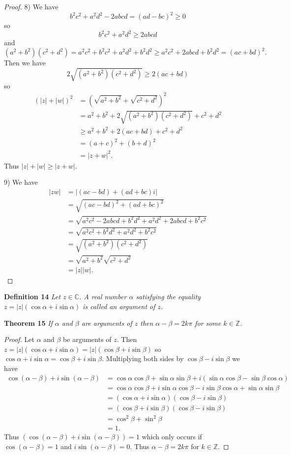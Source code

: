 \documentclass{article}
\begin{document}
\begin{flushleft}
\begin{proof}
8) We have
\[
b^2c^2 + a^2d^2 -2abcd = (ad-bc)^2 \geq 0
\]
so
\[
b^2c^2 + a^2d^2 \geq 2abcd
\]
and
\[
(a^2 + b^2)(c^2 + d^2) = a^2c^2 +b^2c^2 + a^2d^2 + b^2d^2 \geq a^2c^2 + 2abcd + b^2d^2 = (ac+bd)^2.
\]
Then we have
\[
2 \sqrt{(a^2 + b^2)(c^2 + d^2)} \geq 2(ac+bd)
\]
so
\begin{align*}
(|z| + |w|)^2 &= (\sqrt{a^2 + b^2} + \sqrt{c^2 + d^2})^2 \\
		   &= a^2 + b^2 + 2 \sqrt{(a^2 + b^2)(c^2 + d^2)} + c^2 + d^2 \\
		   & \geq a^2 + b^2 + 2(ac+bd) + c^2 + d^2 \\
		   &= (a+c)^2 + (b+d)^2 \\
		   &= |z+w|^2.
\end{align*}
Thus $|z| + |w| \geq |z+w|$.\newline

9) We have
\begin{align*}
|zw| &= |(ac-bd) + (ad+bc)i| \\
	&= \sqrt{(ac-bd)^2 + (ad+bc)^2} \\
	&= \sqrt{a^2c^2 -2abcd + b^2d^2 + a^2d^2 + 2abcd + b^2c^2} \\
	&= \sqrt{a^2c^2 + b^2d^2 + a^2d^2 + b^2c^2} \\
	&= \sqrt{(a^2 + b^2)(c^2 + d^2)} \\
	&= \sqrt{a^2 + b^2} \sqrt{c^2 + d^2} \\
	&= |z||w|.
\end{align*}
\end{proof}

\textbf{Definition 14}
\textsl{Let $z \in \mathbb{C}$. A real number $\alpha$ satisfying the equality $z = |z| (\cos \alpha + i \sin \alpha)$ is called an argument of $z$.}\newline

\textbf{Theorem 15}
\textsl{If $\alpha$ and $\beta$ are arguments of $z$ then $\alpha - \beta = 2k \pi$ for some $k \in \mathbb{Z}$.}
\begin{proof}
Let $\alpha$ and $\beta$ be arguments of $z$. Then $z = |z| (\cos \alpha + i \sin \alpha) = |z| (\cos \beta + i \sin \beta)$ so $\cos \alpha + i\sin \alpha = \cos \beta + i\sin \beta$. Multiplying both sides by $\cos \beta - i \sin \beta$ we have
\begin{align*}
\cos (\alpha - \beta) + i \sin (\alpha - \beta) &= \cos \alpha \cos \beta + \sin \alpha \sin \beta + i (\sin \alpha \cos \beta - \sin \beta \cos \alpha) \\
	&= \cos \alpha \cos \beta + i \sin \alpha \cos \beta - i \sin \beta \cos \alpha + \sin \alpha \sin \beta \\
	&= (\cos \alpha + i \sin \alpha)(\cos \beta - i \sin \beta) \\
	&= (\cos \beta + i \sin \beta)(\cos \beta - i \sin \beta) \\
	&= \cos^2 \beta + \sin^2 \beta \\
	&= 1.
\end{align*}
Thus $(\cos (\alpha - \beta) + i \sin (\alpha - \beta)) = 1$ which only occurs if $\cos (\alpha - \beta) = 1$ and $i \sin (\alpha - \beta) = 0$. Thus $\alpha - \beta = 2k \pi$ for $k \in \mathbb{Z}$.
\end{proof}


\end{flushleft}
\end{document}
